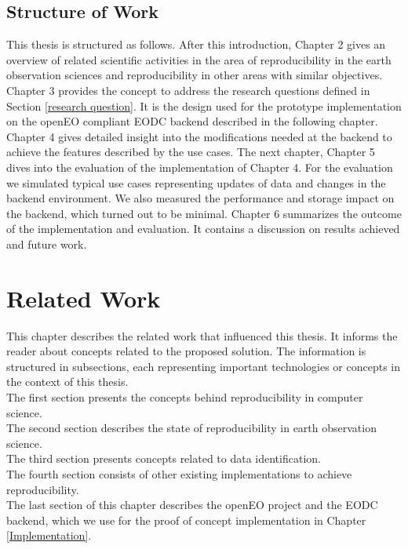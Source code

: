 \documentclass[draft,final]{vutinfth} %
\begin{document}
\section{Structure of Work}\label{Structure}
This thesis is structured as follows. After this introduction, Chapter 2 gives an overview of related scientific activities in the area of reproducibility in the earth observation sciences and reproducibility in other areas with similar objectives. Chapter 3 provides the concept to address the research questions defined in Section \ref{research question}. It is the design used for the prototype implementation on the openEO compliant EODC backend described in the following chapter. Chapter 4 gives detailed insight into the modifications needed at the backend to achieve the features described by the use cases. The next chapter, Chapter 5 dives into the evaluation of the implementation of Chapter 4. For the evaluation we simulated typical use cases representing updates of data and changes in the backend environment. We also measured the performance and storage impact on the backend, which turned out to be minimal. 
Chapter 6 summarizes the outcome of the implementation and evaluation. It contains a discussion on results achieved and future work. 

\chapter{Related Work}\label{Related Work}


This chapter describes the related work that influenced this thesis. It informs the reader about concepts related to the proposed solution. The information is structured in subsections, each representing important technologies or concepts in the context of this thesis. \\The first section presents the concepts behind reproducibility in computer science. \\
The second section describes the state of reproducibility in earth observation science. \\
The third section presents concepts related to data identification. \\ 
The fourth section consists of other existing implementations to achieve reproducibility. \\
The last section of this chapter describes the openEO project and the EODC backend, which we use for the proof of concept implementation in Chapter \ref{Implementation}.      
\end{document}
